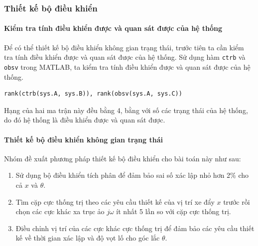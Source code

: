 \documentclass[12pt,a4paper]{article}
\begin{document}
\subsubsection{Thiết kế bộ điều khiển}

\paragraph{Kiểm tra tính điều khiển được và quan sát được của hệ thống}\mbox{}

Để có thể thiết kế bộ điều khiển không gian trạng thái, trước tiên ta cần kiểm tra tính điều khiển được và quan sát được của hệ thống. Sử dụng hàm \texttt{ctrb} và \texttt{obsv} trong MATLAB, ta kiểm tra tính điều khiển được và quan sát được của hệ thống.
\begin{lstlisting}[style=matlabstyle,caption=Kiểm tra tính điều khiển được và quan sát được của hệ thống]
rank(ctrb(sys.A, sys.B)), rank(obsv(sys.A, sys.C))
\end{lstlisting}

Hạng của hai ma trận này đều bằng 4, bằng với số các trạng thái của hệ thống, do đó hệ thống là điều khiển được và quan sát được.

\paragraph{Thiết kế bộ điều khiển không gian trạng thái}\mbox{}

Nhóm đề xuất phương pháp thiết kế bộ điều khiển cho bài toán này như sau:
\begin{enumerate}
    \item Sử dụng bộ điều khiển tích phân để đảm bảo sai số xác lập nhỏ hơn 2\% cho cả $x$ và $\theta$.
    \item Tìm cặp cực thống trị theo các yêu cầu thiết kế của vị trí xe đẩy $x$ trước rồi chọn các cực khác xa trục ảo $j\omega$ ít nhất 5 lần so với cặp cực thống trị.
    \item Điều chỉnh vị trí của các cực khác cực thống trị để đảm bảo các yêu cầu thiết kế về thời gian xác lập và độ vọt lố cho góc lắc $\theta$.
\end{enumerate} 
\end{document}
